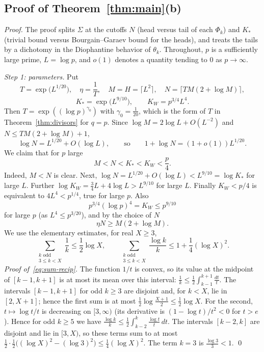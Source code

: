\subsection{Proof of Theorem~\ref{thm:main}(b)}

\begin{proof}
The proof splits $\Sigma$ at the cutoffs $N$ (head versus tail of each $\Phi_k$) and $K_*$ (trivial bound versus Bourgain--Garaev bound for the heads), and treats the tails by a dichotomy in the Diophantine behavior of $\theta_k$. Throughout, $p$ is a sufficiently large prime, $L=\log p$, and $o(1)$ denotes a quantity tending to $0$ as $p\to\infty$.

\smallskip
\emph{Step 1: parameters.} Put
\[
T=\exp\bigl(L^{1/20}\bigr),\quad\eta=\frac1T,\quad M=H=\lceil L^2\rceil,\quad N=\bigl\lceil TM(2+\log M)\bigr\rceil,
\]
\[
K_*=\exp\bigl(L^{9/10}\bigr),\qquad K_W=p^{3/4}L^4 .
\]
Then $T=\exp((\log p)^{\gamma_0})$ with $\gamma_0=\frac1{20}$, which is the form of $T$ in Theorem~\ref{thm:divisors} for $q=p$. Since $\log M=2\log L+O(L^{-2})$ and $N\le TM(2+\log M)+1$,
\begin{equation}\label{eq:logN}
\log N=L^{1/20}+O(\log L),\qquad\text{so}\qquad 1+\log N=(1+o(1))L^{1/20}.
\end{equation}
We claim that for $p$ large
\begin{equation}\label{eq:param-chain}
M<N<K_*<K_W<\frac p4 .
\end{equation}
Indeed, $M<N$ is clear. Next, $\log N=L^{1/20}+O(\log L)<L^{9/10}=\log K_*$ for large $L$. Further $\log K_W=\frac34L+4\log L>L^{9/10}$ for large $L$. Finally $K_W<p/4$ is equivalent to $4L^4<p^{1/4}$, true for large $p$. Also
\begin{equation}\label{eq:KW-range}
p^{3/4}(\log p)^4=K_W\le p^{9/10}
\end{equation}
for large $p$ (as $L^4\le p^{3/20}$), and by the choice of $N$
\begin{equation}\label{eq:etaN}
\eta N\ge M(2+\log M).
\end{equation}
We use the elementary estimates, for real $X\ge3$,
\begin{equation}\label{eq:sum-recip}
\sum_{\substack{k\text{ odd}\\ 3\le k<X}}\frac1k\le\frac12\log X,\qquad
\sum_{\substack{k\text{ odd}\\ 3\le k<X}}\frac{\log k}k\le1+\frac14(\log X)^2 .
\end{equation}
\emph{Proof of~\eqref{eq:sum-recip}.} The function $1/t$ is convex, so its value at the midpoint of $[k-1,k+1]$ is at most its mean over this interval: $\frac1k\le\frac12\int_{k-1}^{k+1}\frac{dt}t$. The intervals $[k-1,k+1]$ for odd $k\ge3$ are disjoint and, for $k<X$, lie in $[2,X+1]$; hence the first sum is at most $\frac12\log\frac{X+1}2\le\frac12\log X$. For the second, $t\mapsto\log t/t$ is decreasing on $[3,\infty)$ (its derivative is $(1-\log t)/t^2<0$ for $t>e$). Hence for odd $k\ge5$ we have $\frac{\log k}k\le\frac12\int_{k-2}^k\frac{\log t}t\,dt$. The intervals $[k-2,k]$ are disjoint and lie in $[3,X)$, so these terms sum to at most $\frac12\cdot\frac12\bigl((\log X)^2-(\log3)^2\bigr)\le\frac14(\log X)^2$. The term $k=3$ is $\frac{\log3}3<1$. \qed


\end{proof}
